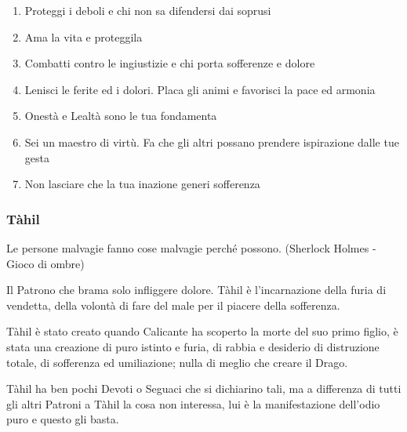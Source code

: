 \begin{multicols}{2}
\begin{enumerate}[leftmargin=*] \setlength{\itemsep}{0pt}
\item Proteggi i deboli e chi non sa difendersi dai soprusi
\item Ama la vita e proteggila
\item Combatti contro le ingiustizie e chi porta sofferenze e dolore
\item Lenisci le ferite ed i dolori. Placa gli animi e favorisci la pace ed armonia
\item Onestà e Lealtà sono le tua fondamenta
\item Sei un maestro di virtù. Fa che gli altri possano prendere ispirazione dalle tue gesta
\item Non lasciare che la tua inazione generi sofferenza
\end{enumerate}

\subsubsection{Tàhil}\label{tahil}\hypertarget{tahil}{}

\begin{enfasi}{
Le persone malvagie fanno cose malvagie perché possono. (Sherlock Holmes - Gioco di ombre)
}\end{enfasi}

Il Patrono che brama solo infliggere dolore. Tàhil è l'incarnazione della furia di vendetta, della volontà di fare del male per il piacere della sofferenza.

Tàhil è stato creato quando Calicante ha scoperto la morte del suo primo figlio, è stata una creazione di puro istinto e furia, di rabbia e desiderio di distruzione totale, di sofferenza ed umiliazione; nulla di meglio che creare il Drago.

Tàhil ha ben pochi Devoti o Seguaci che si dichiarino tali, ma a differenza di tutti gli altri Patroni a Tàhil la cosa non interessa, lui è la manifestazione dell'odio puro e questo gli basta.


\end{multicols}

